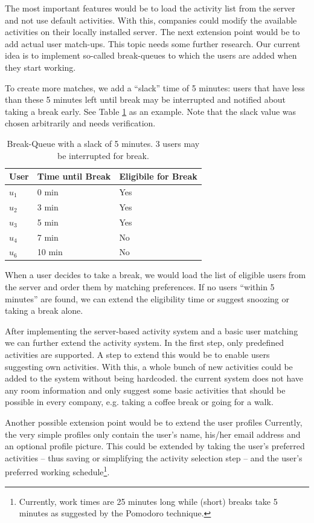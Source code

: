 The most important features would be to load the activity list from the server and not use default activities. With 
this, companies could modify the available activities on their locally installed server. The next extension point 
would be to add actual user match-ups. This topic needs some further research. Our current idea is to implement 
so-called break-queues to which the users are added when they start working. 

To create more matches, we add a ``slack'' time of 5 minutes: users that have less than these 5 minutes left until 
break may be interrupted and notified about taking a break early. See Table \ref{tab:break-queues} as an example. Note 
that the slack value was chosen arbitrarily and needs verification.

\begin{table}[ht]
 \centering
 \begin{tabular}{lll}
  \textbf{User} & \textbf{Time until Break} & \textbf{Eligibile for Break} \\
  \hline
  \(u_1\) &  0 min & Yes \\
  \(u_2\) &  3 min & Yes \\
  \(u_3\) &  5 min & Yes \\
  \(u_4\) &  7 min & No \\
  \(u_6\) & 10 min & No \\
  \hline
 \end{tabular}
 \caption{Break-Queue with a slack of 5 minutes. 3 users may be interrupted for break.}
 \label{tab:break-queues}
\end{table}

When a user decides to take a break, we would load the list of eligible users from the server and order them by matching preferences. If no 
users ``within 5 minutes'' are found, we can extend the eligibility time or suggest snoozing or taking a break alone. 


After implementing the server-based activity system and a basic user matching we can further extend the activity 
system. In the first step, only predefined activities are supported. A step to extend this would be to enable users 
suggesting own activities. With this, a whole bunch of new activities could be added to the system without being 
hardcoded. the current system does not have any room information and only suggest some basic activities that should be 
possible in every company, e.g. taking a coffee break or going for a walk. 

Another possible extension point would be to extend the user profiles Currently, the very simple profiles only contain 
the user's name, his/her email address and an optional profile picture. This could be extended by taking the user's 
preferred activities -- thus saving or simplifying the activity selection step -- and the user's preferred working 
schedule\footnote{Currently, work times are 25 minutes long while (short) breaks take 5 minutes as suggested by the 
Pomodoro technique.}. 

